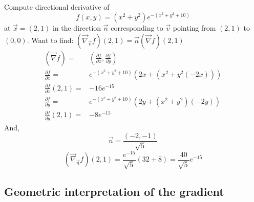 \documentclass[12pt]{book}
\theoremstyle{definition}
\theoremstyle{remark}
\begin{document}
        \begin{example}
          Compute directional derivative of 
          $$f(x,y) = (x^2 + y^2) e^{-(x^2 + y^2 + 10)} $$ 
          at $\vec{{x}} = (2,1)$ in the direction $\vec{{n}}$ corresponding to $\vec{{v}} $ pointing from $(2,1)$ to $(0,0)$. 
          Want to find:
         $ 
              (\vec{{\nabla}}_{\vec{{v}}} f)(2,1) = \vec{{n}} (\vec{{\nabla}}f) ( 2,1 )
            $
          \begin{equation*}
            \begin{split}
              (\vec{{\nabla}}f) =& \left(\frac{\partial {f}}{\partial {x}} , \frac{\partial {f}}{\partial {y}}  \right) \\ 
              \frac{\partial {f}}{\partial {x}} =& e^{-(x^2+y^2 +10)} (2x + (x^2 + y^2 (-2x))) \\ 
              \frac{\partial {f}}{\partial {x}}(2,1) =& -16e^{-15} \\ 
              \frac{\partial {f}}{\partial {y}} =& e^{-(x^2+y^2 +10)} (2y +(x^2+ y^2)(-2y))  \\ 
              \frac{\partial {f}}{\partial {y}}(2,1) =& -8e^{-15} 
            \end{split}
          \end{equation*}
          And, 
          $$\vec{{n}} = \frac{(-2, -1)}{\sqrt{5}}$$
          $$(\vec{{\nabla}}_{\vec{{n}}} f)(2,1) = \frac{e^{-15}}{\sqrt{5}} (32 + 8) = \frac{40 }{\sqrt{5}} e^{-15} $$
        \end{example}
       \subsection{Geometric interpretation of the gradient}%
        \label{sub:Geometric interpretation of the gradient}
         
\end{document}
